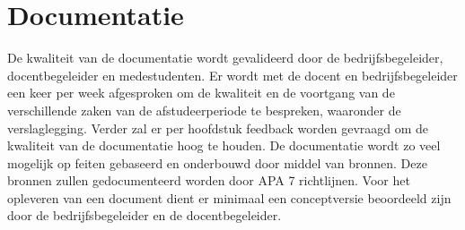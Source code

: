 \section{Documentatie}
De kwaliteit van de documentatie wordt gevalideerd door de bedrijfsbegeleider, docentbegeleider en medestudenten.
Er wordt met de docent en bedrijfsbegeleider een keer per week afgesproken om de kwaliteit en de voortgang van de verschillende zaken van de afstudeerperiode te bespreken, waaronder de verslaglegging.
Verder zal er per hoofdstuk feedback worden gevraagd om de kwaliteit van de documentatie hoog te houden.
De documentatie wordt zo veel mogelijk op feiten gebaseerd en onderbouwd door middel van bronnen.
Deze bronnen zullen gedocumenteerd worden door APA 7 richtlijnen.
Voor het opleveren van een document dient er minimaal een conceptversie beoordeeld zijn door de bedrijfsbegeleider en de docentbegeleider.

